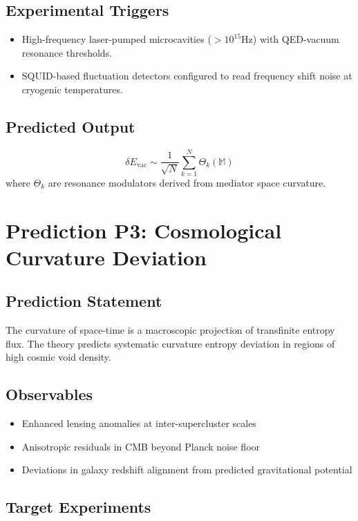 \documentclass[11pt]{article}
\begin{document}
\subsection{Experimental Triggers}

\begin{itemize}
    \item High-frequency laser-pumped microcavities (\(> 10^{15} \text{Hz}\)) with QED-vacuum resonance thresholds.
    \item SQUID-based fluctuation detectors configured to read frequency shift noise at cryogenic temperatures.
\end{itemize}

\subsection{Predicted Output}

\[
\delta E_{\text{vac}} \sim \frac{1}{\sqrt{N}} \sum_{k=1}^N \Theta_k(\mathbb{M})
\]
where \(\Theta_k\) are resonance modulators derived from mediator space curvature.

\section{Prediction P3: Cosmological Curvature Deviation}

\subsection{Prediction Statement}

The curvature of space-time is a macroscopic projection of transfinite entropy flux. The theory predicts systematic curvature entropy deviation in regions of high cosmic void density.

\subsection{Observables}

\begin{itemize}
    \item Enhanced lensing anomalies at inter-supercluster scales
    \item Anisotropic residuals in CMB beyond Planck noise floor
    \item Deviations in galaxy redshift alignment from predicted gravitational potential
\end{itemize}

\subsection{Target Experiments}
\end{document}
